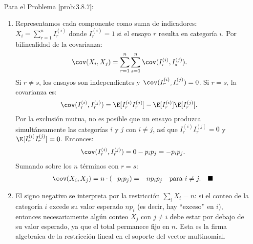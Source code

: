 \begin{solucion}
	\label{sol:3.8.7}
	Para el Problema \ref{prob:3.8.7}:
	\begin{enumerate}
		\item Representamos cada componente como suma de indicadores: $X_{i} = \sum_{r=1}^{n} I_{r}^{(i)}$ donde $I_{r}^{(i)} = 1$ si el ensayo $r$ resulta en categoría $i$. Por bilinealidad de la covarianza:
		\begin{align*}
			\cov(X_{i}, X_{j}) &= \sum_{r=1}^{n} \sum_{s=1}^{n} \cov(I_{r}^{(i)}, I_{s}^{(j)}).
		\end{align*}
		Si $r \neq s$, los ensayos son independientes y $\cov(I_{r}^{(i)}, I_{s}^{(j)}) = 0$. Si $r = s$, la covarianza es:
		\begin{align*}
			\cov(I_{r}^{(i)}, I_{r}^{(j)}) &= \E[I_{r}^{(i)} I_{r}^{(j)}] - \E[I_{r}^{(i)}] \E[I_{r}^{(j)}].
		\end{align*}
		Por la exclusión mutua, no es posible que un ensayo produzca simultáneamente las categorías $i$ y $j$ con $i \neq j$, así que $I_{r}^{(i)} I_{r}^{(j)} = 0$ y $\E[I_{r}^{(i)} I_{r}^{(j)}] = 0$. Entonces:
		\begin{align*}
			\cov(I_{r}^{(i)}, I_{r}^{(j)}) = 0 - p_{i} p_{j} = -p_{i} p_{j}.
		\end{align*}
		Sumando sobre los $n$ términos con $r = s$:
		\begin{align*}
			\cov(X_{i}, X_{j}) = n \cdot (-p_{i} p_{j}) = -n p_{i} p_{j} \quad \text{para } i \neq j. \quad \blacksquare
		\end{align*}
		\item El signo negativo se interpreta por la restricción $\sum_{i} X_{i} = n$: si el conteo de la categoría $i$ excede su valor esperado $np_{i}$ (es decir, hay ``exceso'' en $i$), entonces necesariamente algún conteo $X_{j}$ con $j \neq i$ debe estar por debajo de su valor esperado, ya que el total permanece fijo en $n$. Esta es la firma algebraica de la restricción lineal en el soporte del vector multinomial.
	\end{enumerate}
\end{solucion}

